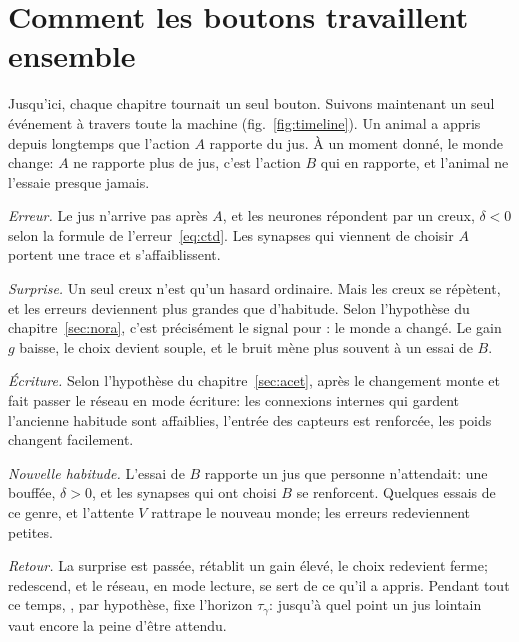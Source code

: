 \section{Comment les boutons travaillent ensemble}

Jusqu'ici, chaque chapitre tournait un seul bouton. Suivons maintenant un seul événement à travers toute la machine (fig.~\ref{fig:timeline}). Un animal a appris depuis longtemps que l'action $A$ rapporte du jus. À un moment donné, le monde change: $A$ ne rapporte plus de jus, c'est l'action $B$ qui en rapporte, et l'animal ne l'essaie presque jamais.

\emph{Erreur.} Le jus n'arrive pas après $A$, et les neurones  répondent par un creux, $\delta<0$ selon la formule de l'erreur~\eqref{eq:ctd}. Les synapses qui viennent de choisir $A$ portent une trace et s'affaiblissent.

\emph{Surprise.} Un seul creux n'est qu'un hasard ordinaire. Mais les creux se répètent, et les erreurs deviennent plus grandes que d'habitude. Selon l'hypothèse du chapitre~\ref{sec:nora}, c'est précisément le signal pour : le monde a changé. Le gain $g$ baisse, le choix devient souple, et le bruit mène plus souvent à un essai de $B$.

\emph{Écriture.} Selon l'hypothèse du chapitre~\ref{sec:acet}, après le changement  monte et fait passer le réseau en mode écriture: les connexions internes qui gardent l'ancienne habitude sont affaiblies, l'entrée des capteurs est renforcée, les poids changent facilement.

\emph{Nouvelle habitude.} L'essai de $B$ rapporte un jus que personne n'attendait: une bouffée, $\delta>0$, et les synapses qui ont choisi $B$ se renforcent. Quelques essais de ce genre, et l'attente $V$ rattrape le nouveau monde; les erreurs redeviennent petites.

\emph{Retour.} La surprise est passée,  rétablit un gain élevé, le choix redevient ferme;  redescend, et le réseau, en mode lecture, se sert de ce qu'il a appris. Pendant tout ce temps, , par hypothèse, fixe l'horizon $\tau_\gamma$: jusqu'à quel point un jus lointain vaut encore la peine d'être attendu.

